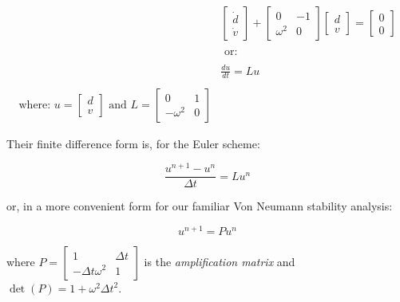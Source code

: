 \begin{equation}
	\begin{aligned}
		& {\left[\begin{array}{l}
				\dot{d} \\
				\dot{v}
			\end{array}\right]+\left[\begin{array}{ll}
				0 & -1 \\
				\omega^2 & 0
			\end{array}\right]\left[\begin{array}{l}
				d \\
				v
			\end{array}\right]=\left[\begin{array}{l}
				0 \\
				0
			\end{array}\right]} \\
		\\
		& \text {     or:    } \\
		\\
		& \frac{du}{dt}=L u \\
		\\
		\text{where:      } u=\left[\begin{array}{l}
			d \\
			v
		\end{array}\right]   \text{     and         } L=\left[\begin{array}{cc}
			0 & 1 \\
			-\omega^2 & 0
		\end{array}\right]
	\end{aligned}
	\label{OscillatorDecoupled}
\end{equation}

Their finite difference form is, for the Euler scheme:

\begin{equation}
	\frac{u^{n+1} -u^n}{\Delta t} = L u^n 
\end{equation}

or, in a more convenient form for our familiar Von Neumann stability analysis:

\begin{equation}
u^{n+1}=P u^n 
\end{equation}

where $P=\left[\begin{array}{cc}
	1 & \Delta t \\
	-\Delta t \omega^2 & 1
\end{array}\right]$ is the \emph{amplification matrix} and $\operatorname{det}(P)=1+\omega^2 \Delta t^2 $.\\


